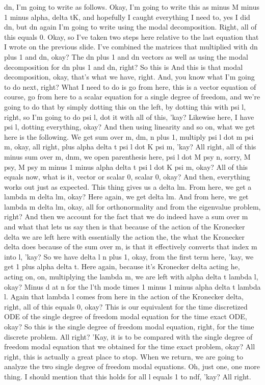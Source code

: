 \documentclass[10pt]{article}
\begin{document}
dn, I'm going to write as follows. Okay, I'm going to write this as minus M minus 1 minus alpha, delta tK, and hopefully I caught everything I need to, yes I did dn, but dn again I'm going to write using the modal decomposition. Right, all of this equals 0. Okay, so I've taken two steps here relative to the last equation that I wrote on the previous slide. I've combined the matrices that multiplied with dn plus 1 and dn, okay? The dn plus 1 and dn vectors as well as using the modal decomposition for dn plus 1 and dn, right? So this is And this is that modal decomposition, okay, that's what we have, right. And, you know what I'm going to do next, right? What I need to do is go from here, this is a vector equation of course, go from here to a scalar equation for a single degree of freedom, and we're going to do that by simply dotting this on the left, by dotting this with psi l, right, so I'm going to do psi l, dot it with all of this, 'kay? Likewise here, I have psi l, dotting everything, okay? And then using linearity and so on, what we get here is the following. We get sum over m, dm, n plus 1, multiply psi l dot m psi m, okay, all right, plus alpha delta t psi l dot K psi m, 'kay? All right, all of this minus sum over m, dnm, we open parenthesis here, psi l dot M psy n, sorry, M psy, M psy m minus 1 minus alpha delta t psi l dot K psi m, okay? All of this equals now, what is it, vector or scalar 0, scalar 0, okay? And then, everything works out just as expected. This thing gives us a delta lm. From here, we get a lambda m delta lm, okay? Here again, we get delta lm. And from here, we get lambda m delta lm, okay, all for orthonormality and from the eigenvalue problem, right? And then we account for the fact that we do indeed have a sum over m and what that lets us say then is that because of the action of the Kronecker delta we are left here with essentially the action the, the what the Kronecker delta does because of the sum over m, is that it effectively converts that index m into l, 'kay? So we have delta l n plus 1, okay, from the first term here, 'kay, we get 1 plus alpha delta t. Here again, because it's Kronecker delta acting he, acting on, on, multiplying the lambda m, we are left with alpha delta t lambda l, okay? Minus d at n for the l'th mode times 1 minus 1 minus alpha delta t lambda l. Again that lambda l comes from here in the action of the Kronecker delta, right, all of this equals 0, okay? This is our equivalent for the time discretized ODE of the single degree of freedom modal equation for the time exact ODE, okay? So this is the single degree of freedom modal equation, right, for the time discrete problem. All right? 'Kay, it is to be compared with the single degree of freedom modal equation that we obtained for the time exact problem, okay? All right, this is actually a great place to stop. When we return, we are going to analyze the two single degree of freedom modal equations. Oh, just one, one more thing. I should mention that this holds for all l equals 1 to ndf, 'kay? All right.
\end{document}
